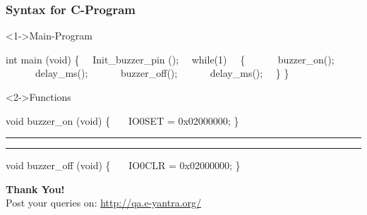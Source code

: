 \documentclass[10pt,red]{beamer}
\begin{document}
\begin{frame}[shrink = 4,fragile]
	\frametitle{Syntax for C-Program} \pause
	
		\begin{block}<1->{Main-Program}	\pause
		\begin{semiverbatim}
				int main (void) 
				\{
			\ \		 Init_buzzer_pin ();
			\ \		 while(1)
			\ \	 	\{
			\ \ \ \ \ \				buzzer_on();
			\ \ \ \ \ \				delay_ms();
			\ \ \ \	\ \			buzzer_off();
			\ \ \ \	\ \			delay_ms();
			\ \	 	\}	
				\}	
			\end{semiverbatim}
		\end{block} \pause
	
	\begin{block}<2->{Functions}\pause
		\begin{semiverbatim}
				void buzzer_on (void)
				\{
 		\ \ \		IO0SET = 0x02000000;		
				\}
				
				\hrule \hrule	\pause
				void buzzer_off (void)
				\{
 		\ \ \		IO0CLR = 0x02000000;		
				\}
 		\end{semiverbatim}
	\end{block}
		
\end{frame}
\begin{frame}
\hskip4cm
\textbf{\LARGE Thank You!} \\[20pt]
\hskip3cm
\scriptsize Post your queries on: 
\hyperref[www.e-yantra.org]{\color{blue} http://qa.e-yantra.org/ \color{black}} 
\end{frame}
\end{document}

